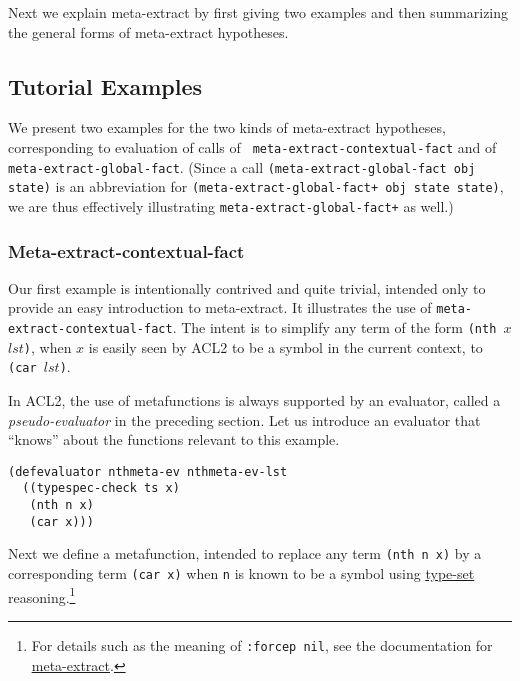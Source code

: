 Next we explain meta-extract by first giving two examples and then
summarizing the general forms of meta-extract hypotheses.

\subsection{Tutorial Examples}

We present two examples for the two kinds of meta-extract hypotheses,
corresponding to evaluation of calls of {\tt
  meta-extract-contextual-fact} and of {\tt meta-extract-global-fact}.
(Since a call {\tt (meta-extract-global-fact obj state)} is an
abbreviation for
{\tt (meta-extract-global-fact+ obj state state)}, we are
thus effectively illustrating {\tt meta-extract-global-fact+} as
well.)

\subsubsection{Meta-extract-contextual-fact}

Our first example is intentionally contrived and quite trivial,
intended only to provide an easy introduction to meta-extract.  It
illustrates the use of {\tt meta-extract-contextual-fact}.  The intent
is to simplify any term of the form {\tt (nth $x$ $lst$)}, when $x$ is
easily seen by ACL2 to be a symbol in the current context, to {\tt
  (car $lst$)}.

In ACL2, the use of metafunctions is always supported by an evaluator,
called a {\em pseudo-evaluator} in the preceding section.  Let us
introduce an evaluator that ``knows'' about the functions relevant to
this example.

\begin{verbatim}
(defevaluator nthmeta-ev nthmeta-ev-lst
  ((typespec-check ts x)
   (nth n x)
   (car x)))
\end{verbatim}

\noindent Next we define a metafunction, intended to replace any term
{\tt (nth n x)} by a corresponding term {\tt (car x)} when {\tt n} is
known to be a symbol using
\href{http://www.cs.utexas.edu/users/moore/acl2/manuals/current/manual/index.html?topic=ACL2\_\_\_\_TYPE-SET}{\underline{type-set}}
reasoning.\footnote{For details such as the meaning of {\tt :forcep
    nil}, see the documentation for \href{http://www.cs.utexas.edu/users/moore/acl2/manuals/current/manual/index.html?topic=ACL2\_\_\_\_META-EXTRACT}{\underline{meta-extract}}.}

